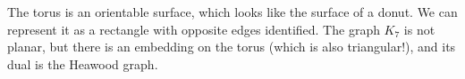The torus is an orientable surface, which looks like the surface of a donut.  We can represent it as a rectangle with opposite edges identified.  The graph $K_7$ is not planar, but there is an embedding on the torus (which is also triangular!), and its dual is the Heawood graph.


\ifdraft

\fi
